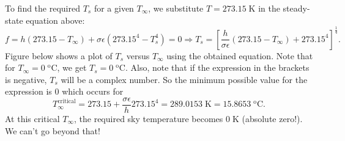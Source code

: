 \documentclass[12pt]{article}
\begin{document}
\begin{ex}
\begin{solution}
  To find the required $T_s$ for a given $T_{\infty}$, we substitute $T=273.15\;\mathrm{K}$ in the steady-state equation above:
  $$f=h(273.15-T_{\infty})+\sigma\epsilon(273.15^4-T_s^4)=0\Rightarrow T_s=\left[\frac{h}{\sigma\epsilon}(273.15-T_{\infty})+273.15^4\right]^{\tfrac{1}{4}}.$$
  Figure below shows a plot of $T_s$ versus $T_{\infty}$ using the obtained equation. Note that for $T_{\infty}=0\;\mathrm{^oC}$, we get $T_s=0\;\mathrm{^oC}$. Also, note that if the expression in the brackets is negative, $T_s$ will be a complex number. So the minimum possible value for the expression is $0$ which occurs for
  $$T_{\infty}^{\mathrm{critical}}=273.15+\frac{\sigma\epsilon}{h}273.15^4=289.0153\;\mathrm{K}=15.8653\;\mathrm{^oC}.$$
  At this critical $T_{\infty}$, the required sky temperature becomes $0\;\mathrm{K}$ (absolute zero!). We can't go beyond that!
  \begin{figure}[h]
  \centering
  \end{figure}
  
\end{solution}
\end{ex}
\end{document}
